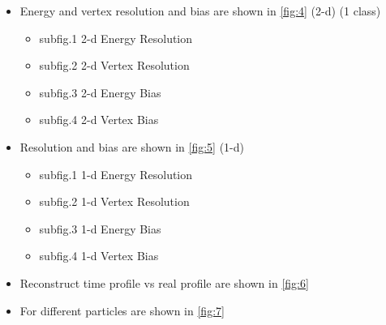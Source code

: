 \documentclass{article}
\begin{document}
	\begin{itemize}
		\item Energy and  vertex resolution and bias are shown in \ref{fig:4} (2-d) (1 class)
			\begin{itemize}
				\item subfig.1 2-d Energy Resolution
				\item subfig.2 2-d Vertex Resolution
				\item subfig.3 2-d Energy Bias
				\item subfig.4 2-d Vertex Bias
			\end{itemize}
		\item Resolution and bias are shown in \ref{fig:5} (1-d)
			\begin{itemize}
				\item subfig.1 1-d Energy Resolution
				\item subfig.2 1-d Vertex Resolution
				\item subfig.3 1-d Energy Bias
				\item subfig.4 1-d Vertex Bias
			\end{itemize}
		\item Reconstruct time profile vs real profile are shown in \ref{fig:6}
		\item For different particles are shown in \ref{fig:7}
	\end{itemize}
	
\end{document}
